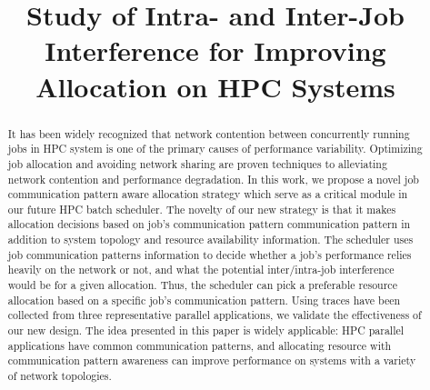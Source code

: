 \documentclass[conference]{IEEEtran}
\begin{document}
%
\title{Study of Intra- and Inter-Job Interference for Improving Allocation on HPC Systems}
\author{



}

\maketitle


\begin{abstract} 

It has been widely recognized that network contention between concurrently running jobs in HPC system is one of the primary causes of performance variability. Optimizing job allocation and avoiding network sharing are proven techniques to alleviating network contention and performance degradation. In this work, we propose a novel job communication pattern aware allocation strategy which serve as a critical module in our future HPC batch scheduler. The novelty of our new strategy is that it makes allocation decisions based on job’s communication pattern communication pattern in addition to system topology and resource availability information. The scheduler uses job communication patterns information to decide whether a job’s performance relies heavily on the network or not, and what the potential inter/intra-job interference would be for a given allocation. Thus, the scheduler can pick a preferable resource allocation based on a specific job's communication pattern. Using traces have been collected from three representative parallel applications, we validate the effectiveness of our new design. The idea presented in this paper is widely applicable: HPC parallel applications have common communication patterns, and allocating resource with communication pattern awareness can improve performance on systems with a variety of network topologies.

\end{abstract}
\end{document}
